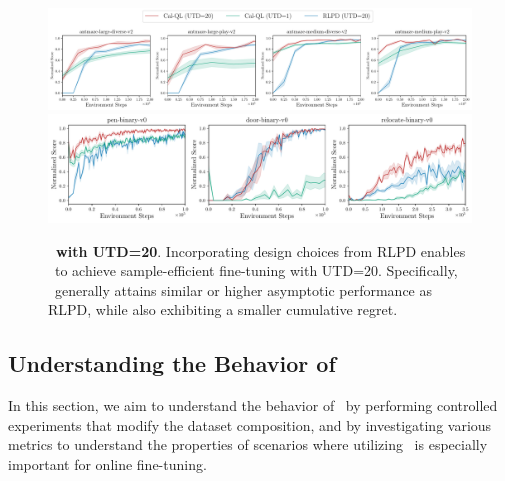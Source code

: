 \fi

\begin{figure}[h]
\begin{center}    
{\includegraphics[clip,width=1\linewidth]{chapters/cal_ql/figs-sample/antmaze-utd20-rlpd-final.pdf}} {\includegraphics[clip,width=0.75\linewidth]{chapters/cal_ql/figs-sample/adroit-rlpd-final.pdf}}
\end{center}
\vspace{-0.3cm}
\caption{\label{fig:rlpd} \footnotesize{\textbf{\methodname\ with UTD=20}. Incorporating design choices from RLPD enables \methodname\ to achieve sample-efficient fine-tuning with UTD=20. Specifically, \methodname\ generally attains similar or higher asymptotic performance as RLPD, while also exhibiting a smaller cumulative regret.}}
\vspace{-0.6cm}
\end{figure}





\vspace{-0.2cm}
\subsection{Understanding the Behavior of \methodname}
\label{subsec:diagonistic}
\vspace{-0.3cm}

In this section, we aim to understand the behavior of \methodname\ by performing controlled experiments that modify the dataset composition, and by investigating various metrics to understand the properties of scenarios where utilizing \methodname\ is especially important for online fine-tuning.         

